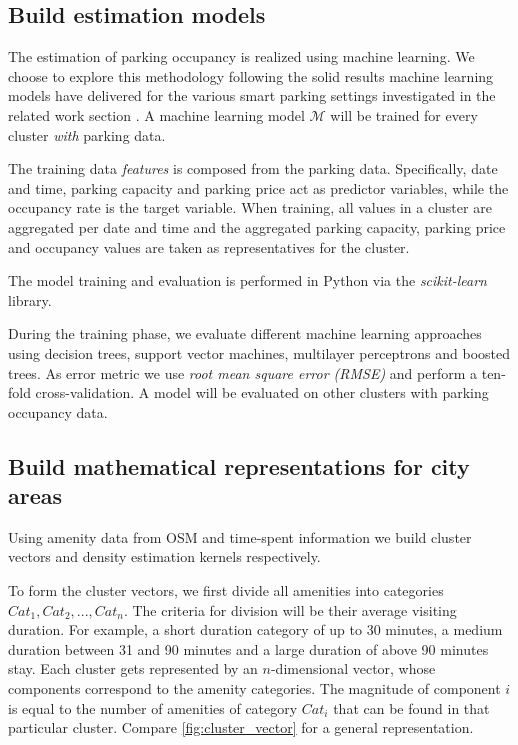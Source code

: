 \documentclass{ws-ijait}
\newcommand{\cmmnt}[1]{\ignorespaces}
\begin{document}
	\subsection{Build estimation models}
	The estimation of parking occupancy is realized using machine learning. We choose to explore this methodology following the solid results machine learning models have delivered for the various smart parking settings investigated in the related work section \cmmnt{\cref{sec:relwork}}. A machine learning model $\mathcal{M}$ will be trained for every cluster \textit{with} parking data.
	
	The training data \textit{features} is composed from the parking data. Specifically, date and time, parking capacity and parking price act as predictor variables, while the occupancy rate is the target variable. When training, all values in a cluster are aggregated per date and time and the aggregated parking capacity, parking price and occupancy values are taken as representatives for the cluster.
	
	The model training and evaluation is performed in Python via the \textit{scikit-learn} library.
	
	During the training phase, we evaluate different machine learning approaches using decision trees, support vector machines, multilayer perceptrons and boosted trees. As error metric we use \textit{root mean square error (RMSE)} and perform a ten-fold cross-validation. A model will be evaluated on other clusters with parking occupancy data.
	
	\subsection{Build mathematical representations for city areas}
	Using amenity data from OSM and time-spent information we build cluster vectors and density estimation kernels respectively.
	
	To form the cluster vectors, we first divide all amenities into categories $Cat_1, Cat_2, ..., Cat_n$. The criteria for division will be their average visiting duration. For example, a short duration category of up to 30 minutes, a medium duration between 31 and 90 minutes and a large duration of above 90 minutes stay. Each cluster gets represented by an $n$-dimensional vector, whose components correspond to the amenity categories. The magnitude of component $i$ is equal to the number of amenities of category $Cat_i$ that can be found in that particular cluster. Compare \cref{fig:cluster_vector} for a general representation.
	
\end{document}
